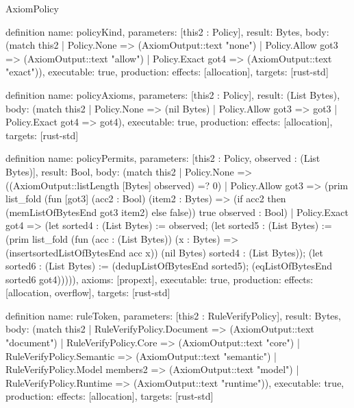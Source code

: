 \begin{lexlean}{AxiomPolicy}
\begin{semanticmodule}
definition{
  name: policyKind,
  parameters: [this2 : Policy],
  result: Bytes,
  body: (match this2
    | Policy.None => (AxiomOutput::text "none")
    | Policy.Allow got3 => (AxiomOutput::text "allow")
    | Policy.Exact got4 => (AxiomOutput::text "exact")),
  executable: true,
  production: {effects: [allocation], targets: [rust-std]}
}

definition{
  name: policyAxioms,
  parameters: [this2 : Policy],
  result: (List Bytes),
  body: (match this2
    | Policy.None => (nil Bytes)
    | Policy.Allow got3 => got3
    | Policy.Exact got4 => got4),
  executable: true,
  production: {effects: [allocation], targets: [rust-std]}
}

definition{
  name: policyPermits,
  parameters: [this2 : Policy, observed : (List Bytes)],
  result: Bool,
  body: (match this2
    | Policy.None => ((AxiomOutput::listLength [Bytes] observed) =? 0)
    | Policy.Allow got3 => (prim list_fold (fun [got3] (acc2 : Bool) (item2 : Bytes) => (if acc2 then (memListOfBytesEnd got3 item2) else false)) true observed : Bool)
    | Policy.Exact got4 => (let sorted4 : (List Bytes) := observed; (let sorted5 : (List Bytes) := (prim list_fold (fun (acc : (List Bytes)) (x : Bytes) => (insertsortedListOfBytesEnd acc x)) (nil Bytes) sorted4 : (List Bytes)); (let sorted6 : (List Bytes) := (dedupListOfBytesEnd sorted5); (eqListOfBytesEnd sorted6 got4))))),
  axioms: [propext],
  executable: true,
  production: {effects: [allocation, overflow], targets: [rust-std]}
}

definition{
  name: ruleToken,
  parameters: [this2 : RuleVerifyPolicy],
  result: Bytes,
  body: (match this2
    | RuleVerifyPolicy.Document => (AxiomOutput::text "document")
    | RuleVerifyPolicy.Core => (AxiomOutput::text "core")
    | RuleVerifyPolicy.Semantic => (AxiomOutput::text "semantic")
    | RuleVerifyPolicy.Model members2 => (AxiomOutput::text "model")
    | RuleVerifyPolicy.Runtime => (AxiomOutput::text "runtime")),
  executable: true,
  production: {effects: [allocation], targets: [rust-std]}
}
\end{semanticmodule}
\end{lexlean}
